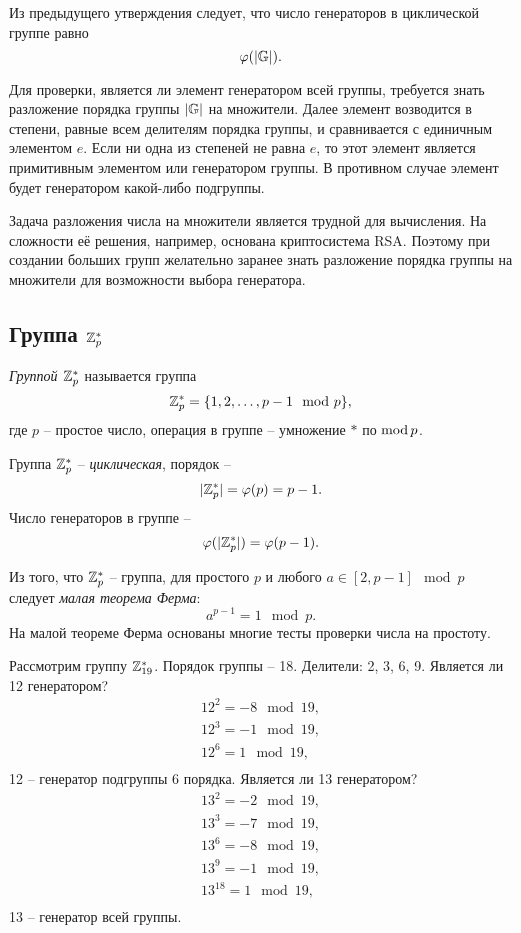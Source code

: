 Из предыдущего утверждения следует, что число генераторов в циклической группе равно
    \[ \varphi(|\mathbb{G}|). \]

Для проверки, является ли элемент генератором всей группы, требуется знать разложение порядка группы $|\mathbb{G}|$ на множители. Далее элемент возводится в степени, равные всем делителям порядка группы, и сравнивается с единичным элементом $e$. Если ни одна из степеней не равна $e$, то этот элемент является примитивным элементом или генератором группы. В противном случае элемент будет генератором какой-либо подгруппы.

Задача разложения числа на множители является трудной для вычисления. На сложности её решения, например, основана криптосистема RSA. Поэтому при создании больших групп желательно заранее знать разложение порядка группы на множители для возможности выбора генератора.


\subsection{Группа $\mathbb{Z}_p^*$}\label{section-group-multiplicative}

\emph{Группой $\mathbb{Z}_p^*$} называется группа
    \[ \mathbb{Z}_p^* = \{1, 2, \dots, p-1 \mod p\}, \]
где $p$ -- простое число, операция в группе -- умножение $\ast$ по $\operatorname{mod} p$.

Группа $\mathbb{Z}_p^*$ -- \emph{циклическая}, порядок --
    \[ |\mathbb{Z}_p^*| = \varphi(p) = p - 1. \]
Число генераторов в группе --
    \[ \varphi(|\mathbb{Z}_p^*|) = \varphi(p-1). \]

Из того, что $\mathbb{Z}_p^*$ -- группа, для простого $p$ и любого $a \in [2, p-1] \mod p$ следует \emph{малая теорема Ферма}:
    \[ a^{p-1} = 1 \mod p. \]
На малой теореме Ферма основаны многие тесты проверки числа на простоту.

\example
Рассмотрим группу $\mathbb{Z}_{19}^*$. Порядок группы -- 18. Делители: 2, 3, 6, 9. Является ли 12 генератором?
\[ \begin{array}{l}
    12^2 = -8 \mod 19, \\
    12^3 = -1 \mod 19, \\
    12^6 = 1 \mod 19, \\
\end{array} \]
12 -- генератор подгруппы 6 порядка. Является ли 13 генератором?
\[ \begin{array}{l}
    13^2 = -2 \mod 19, \\
    13^3 = -7 \mod 19, \\
    13^6 = -8 \mod 19, \\
    13^9 = -1 \mod 19, \\
    13^{18} = 1 \mod 19, \\
\end{array} \]
13 -- генератор всей группы.
\exampleend

